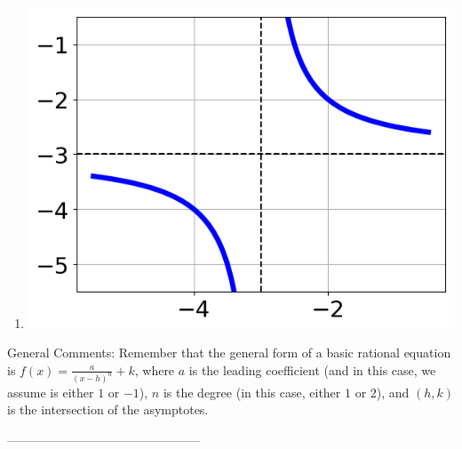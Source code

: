 \documentclass{article}[10pt]
\begin{document}
\begin{enumerate}[label=\Alph*.]
\item  
\begin{center}\includegraphics[scale=0.5]{../Figures/question35CB.png}\end{center} 
 
\end{enumerate} 
 
General Comments: Remember that the general form of a basic rational equation is $ f(x) = \frac{a}{(x-h)^n} + k$, where $a$ is the leading coefficient (and in this case, we assume is either $1$ or $-1$), $n$ is the degree (in this case, either $1$ or $2$), and $(h, k)$ is the intersection of the asymptotes.

-----------------------------------------------
\end{document}
